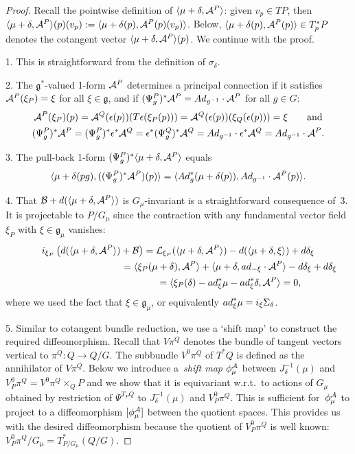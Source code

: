 \documentclass[11pt]{article}
\newcommand{\A}{{\cal A}}
\newcommand{\B}{{\cal B}}
\newcommand{\e}{\epsilon}
\newcommand{\lag}{\mathfrak{g}}
\begin{document}
\begin{proof} Recall the pointwise def\/inition of $\langle \mu +\delta,\A^P\rangle$: given $v_p\in TP$, then $\langle \mu +\delta,\A^P\rangle(p)(v_p) := \langle  \mu +\delta(p),\A^P(p)(v_p)\rangle$. Below, $\langle \mu +\delta(p),\A^P(p)\rangle\in T^*_pP$ denotes the cotangent vector $\langle \mu +\delta,\A^P\rangle(p)$. We continue with the proof.

1. This is straightforward from the def\/inition of $\sigma_\delta$.

 2. The $\lag^*$-valued 1-form $\A^P$ determines a principal connection if it satisf\/ies $\A^P(\xi_P)=\xi$ for all $\xi\in\lag$, and if $(\Psi^P_g)^*\A^P={\rm Ad}_{g^{-1}}\cdot \A^P$ for all $g\in G$:
\begin{gather*}
  \A^P(\xi_P)(p) = \A^Q(\e(p))(T\e(\xi_P(p)))= \A^Q(\e(p))(\xi_Q(\e(p))) = \xi \qquad \mbox{and}\\
 (\Psi^P_g)^*\A^P= (\Psi^P_g)^*\e^*\A^Q = \e^* (\Psi^Q_g)^*\A^Q = {\rm Ad}_{g^{-1}}\cdot \e^*\A^Q ={\rm Ad}_{g^{-1}}\cdot\A^P.
\end{gather*}

3. The pull-back 1-form $(\Psi^P_g)^*\langle \mu +\delta,\A^P\rangle$ equals
\[
 \langle \mu +\delta(pg),((\Psi^P_g)^*\A^P)(p)\rangle=\langle {\rm Ad}_g^*( \mu +\delta(p)),{\rm Ad}_{g^{-1}}\cdot\A^P(p)\rangle.
\]

 4. That $\B + d(\langle \mu +\delta,\A^P\rangle)$ is $G_\mu$-invariant is a straightforward consequence of~3. It is projectable to $P/G_\mu$ since the contraction with any fundamental vector f\/ield $\xi_P$ with $\xi\in\lag_\mu$ vanishes:
    \begin{gather*}
 i_{\xi_P}\left(d(\langle \mu +\delta,\A^P\rangle)+\B\right)   = {\cal L}_{\xi_P}(\langle \mu +\delta,\A^P\rangle)- d(\langle\mu+\delta,\xi\rangle) + d\delta_{\xi}  \\
 \phantom{i_{\xi_P}\left(d(\langle \mu +\delta,\A^P\rangle)+\B\right)  }{}
 = \langle \xi_P(\mu+\delta),\A^P\rangle + \langle\mu+\delta,{\rm ad}_{-\xi}\cdot\A^P\rangle - d\delta_\xi  + d\delta_{\xi}\\
 \phantom{i_{\xi_P}\left(d(\langle \mu +\delta,\A^P\rangle)+\B\right)  }{}
  = \langle \xi_P(\delta)-{\rm ad}^*_\xi\mu-{\rm ad}^*_\xi \delta,\A^P\rangle =0,
\end{gather*}
where we used the fact that $\xi\in\lag_\mu$, or equivalently ${\rm ad}^*_\xi\mu = i_\xi\Sigma_\delta$.

 5. Similar to cotangent bundle reduction, we use a `shift map' to construct the required dif\/feomorphism. Recall that $V\pi^Q$ denotes the bundle of tangent vectors vertical to $\pi^Q:Q\to Q/G$. The subbundle $V^0\pi^Q$ of $T^*Q$ is def\/ined as the annihilator of $V\pi^Q$. Below we introduce a~{\em shift map} $\phi_\mu^{\A}$ between $J^{-1}_\delta(\mu)$ and $V^0_P\pi^Q = V^0\pi^Q\times_Q P$ and we show that it is equivariant w.r.t.\ to actions of $G_\mu$ obtained by restriction of $\Psi^{T_PQ}$ to $J_\delta^{-1}(\mu)$ and $V^0_P\pi^Q$. This is suf\/f\/icient for~$\phi_\mu^{\A}$ to project to a dif\/feomorphism $[\phi_\mu^{\A}]$ between the quotient spaces. This provides us with the desired dif\/feomorphism because the quotient of $V^0_P\pi^Q$ is well known: $V^0_P\pi^Q/G_\mu = T^*_{P/G_\mu}(Q/G)$.


\end{proof}
\end{document}
